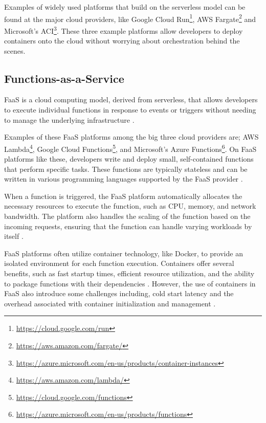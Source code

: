 \documentclass[
  table]{report}
\begin{document}
Examples of widely used platforms that build on the serverless model can
be found at the major cloud providers, like Google Cloud Run\footnote{\url{https://cloud.google.com/run}},
\ac{AWS} Fargate\footnote{\url{https://aws.amazon.com/fargate/}} and
Microsoft's \ac{ACI}\footnote{\url{https://azure.microsoft.com/en-us/products/container-instances}}.
These three example platforms allow developers to deploy containers onto
the cloud without worrying about orchestration behind the scenes.

\subsection{Functions-as-a-Service}

\ac{FaaS} is a cloud computing model, derived from serverless, that
allows developers to execute individual functions in response to events
or triggers without needing to manage the underlying infrastructure
\citep{sewakWinningEraServerless2018}.

Examples of these \ac{FaaS} platforms among the big three cloud
providers are; \ac{AWS} Lambda\footnote{\url{https://aws.amazon.com/lambda/}},
Google Cloud Functions\footnote{\url{https://cloud.google.com/functions}},
and Microsoft's Azure Functions\footnote{\url{https://azure.microsoft.com/en-us/products/functions}}.
On FaaS platforms like these, developers write and deploy small,
self-contained functions that perform specific tasks. These functions
are typically stateless and can be written in various programming
languages supported by the FaaS provider
\citep{baldiniServerlessComputingCurrent2017}.

When a function is triggered, the FaaS platform automatically allocates
the necessary resources to execute the function, such as CPU, memory,
and network bandwidth. The platform also handles the scaling of the
function based on the incoming requests, ensuring that the function can
handle varying workloads by itself
\citep{mcgrathServerlessComputingDesign2017}.

FaaS platforms often utilize container technology, like Docker, to
provide an isolated environment for each function execution. Containers
offer several benefits, such as fast startup times, efficient resource
utilization, and the ability to package functions with their
dependencies \citep{vaneykServerlessMorePaaS2018}. However, the use of
containers in FaaS also introduce some challenges including, cold start
latency and the overhead associated with container initialization and
management \citep{wangPeekingCurtainsServerless2018}.
\end{document}
